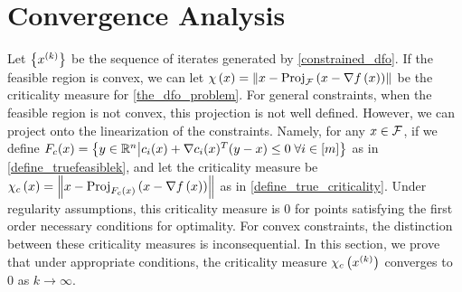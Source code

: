% 
% 
% 
% 

\section{Convergence Analysis}
\label{convex_convergence_analysis}

Let $\left\{x^{(k)}\right\}$ be the sequence of iterates generated by \cref{constrained_dfo}.  If the feasible region is convex, 
we can let $\chi\left(x\right) = \left\|x - {\textrm{Proj}}_{{\mathcal F}}\left(x- \nabla f\left(x\right)\right)\right\|$ be the criticality measure for \cref{the_dfo_problem}.     
For general constraints,  when the feasible region is not convex, this projection is not well defined.
However,
we can project onto the linearization of the constraints.
Namely, for any $x \in {\mathcal F}$, if we define $F_c(x) = \left\{y \in \mathbb R^n \big | c_i(x) + \nabla c_i(x)^T(y - x) \le 0 \; \forall i \in [m] \right\}$ as in \cref{define_truefeasiblek}, 
and let the criticality measure be
$\chi_c\left(x\right) = \left\|x - {\textrm{Proj}}_{F_c(x)}\left(x- \nabla f\left(x\right)\right)\right\|$ as in \cref{define_true_criticality}.
Under regularity assumptions, this criticality measure is $0$ for points satisfying the first order necessary conditions for optimality.
For convex constraints, the distinction between these criticality measures is inconsequential.
In this section, we prove that under appropriate conditions, the criticality measure $\chi_c\left(x^{(k)}\right)$ converges to $0$ as $k\to\infty$.

